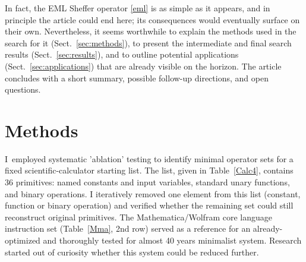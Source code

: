 \documentclass[12pt]{article}
\begin{document}
In fact, the EML Sheffer operator \eqref{eml} is as simple as it appears, and in principle the article could end here; its consequences would eventually surface on their own. Nevertheless, it seems worthwhile to explain the methods used in the search for it (Sect.~\ref{sec:methods}), to present the intermediate and final search results (Sect.~\ref{sec:results}), and to outline potential applications (Sect.~\ref{sec:applications}) that are already visible on the horizon. The article concludes with a short summary, possible follow-up directions,  and open questions.  




\section{Methods \label{sec:methods}}

I~employed systematic 'ablation' testing to identify minimal operator sets for a fixed scientific-calculator starting list. The list, given in Table~\ref{Calc4}, contains 36 primitives: named constants and input variables, standard unary functions, and binary operations. I iteratively removed one element from this list (constant, function or binary operation) and verified whether the remaining set could still reconstruct original primitives. The Mathematica/Wolfram core language \cite{WolframMathematica} instruction set (Table~\ref{Mma}, 2nd row) served as a reference for an already-optimized and thoroughly tested for almost 40 years minimalist system. Research started out of curiosity whether this system could be reduced further.
\end{document}
